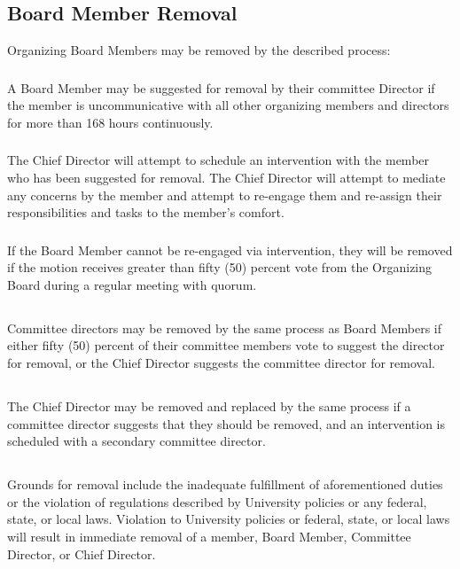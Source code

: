 \documentclass[12pt]{article}
\begin{document}
\subsection{Board Member Removal} Organizing Board Members may be removed by the described process:

\subsubsection{} 
\noindent A Board Member may be suggested for removal by their committee Director 
if the member is uncommunicative with all other organizing members and directors for
more than 168 hours continuously.

\subsubsection{} 
\noindent The Chief Director will attempt to schedule an intervention with 
the member who has been suggested for removal. The Chief Director will attempt to
mediate any concerns by the member and attempt to re-engage them and re-assign
their responsibilities and tasks to the member's comfort. 

\subsubsection{} 
\noindent If the Board Member cannot be re-engaged via intervention,
they will be removed if the motion receives greater than fifty (50) percent vote from 
the Organizing Board during a regular meeting with quorum. 

\subsection{} Committee directors may be removed by the same process 
as Board Members if either fifty
(50) percent of their committee members vote to suggest the director for removal, 
or the Chief Director suggests the committee director for removal. 

\subsection{} The Chief Director may be removed and replaced by the same process
if a committee director suggests 
that they should be removed, and an intervention is scheduled with a secondary 
committee director.

\subsection{} Grounds for removal include the inadequate fulfillment of 
aforementioned duties or the
violation of regulations described by University policies or any federal, 
state, or local laws. Violation to University policies or federal, state, or local laws
will result in immediate removal of a member, Board Member, Committee Director, or
Chief Director.
\end{document}
